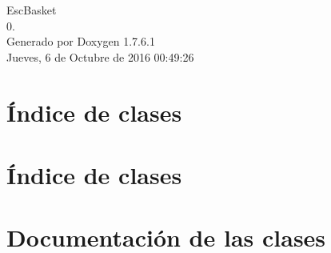\documentclass[a4paper]{book}
\begin{document}
\hypersetup{pageanchor=false,citecolor=blue}
\begin{titlepage}
\vspace*{7cm}
\begin{center}
{\Large \-Esc\-Basket \\[1ex]\large 0. }\\
\vspace*{1cm}
{\large \-Generado por Doxygen 1.7.6.1}\\
\vspace*{0.5cm}
{\small Jueves, 6 de Octubre de 2016 00:49:26}\\
\end{center}
\end{titlepage}
\clearemptydoublepage
{}
\tableofcontents
\clearemptydoublepage
{}
\hypersetup{pageanchor=true,citecolor=blue}
\chapter{Índice de clases}

\chapter{Índice de clases}

\chapter{\-Documentación de las clases}





















\printindex
\end{document}
